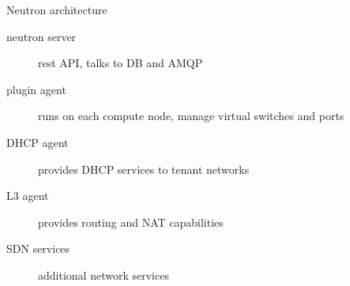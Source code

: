 \documentclass[english,serif,mathserif,xcolor=pdftex,dvipsnames,table]{beamer}
\begin{document}
\begin{frame}
  {Neutron architecture}
  \begin{description}
  \item[neutron server] rest API, talks to DB and AMQP
  \item[plugin agent] runs on each compute node, manage virtual
    switches and ports
  \item[DHCP agent] provides DHCP services to tenant networks
  \item[L3 agent] provides routing and NAT capabilities
  \item[SDN services] additional network services
  \end{description}
\end{frame}


%
%
%
%
%
%
%
%
%
\end{document}
